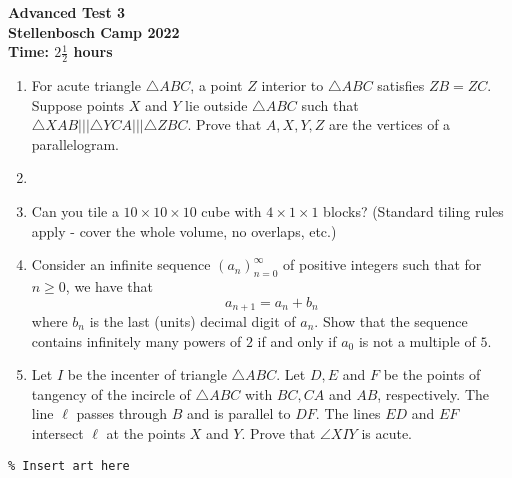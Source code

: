 \documentclass{article}
\begin{document}
\thispagestyle{empty}

\begin{center}
  \textbf{\Large Advanced Test 3}
  \\ \vspace{1em}
  \textbf{\large Stellenbosch Camp 2022}
  \\ \vspace{1em}
  \textbf{\large Time: $2\frac{1}{2}$ hours}
\end{center}

\bigskip

\begin{enumerate}[itemsep=\fill]

\item %
For acute triangle $\triangle ABC$, a point $Z$ interior to $\triangle ABC$ satisfies $ZB=ZC$. Suppose points $X$ and $Y$ lie outside $\triangle ABC$ such that $\triangle XAB |||\triangle YCA |||\triangle ZBC$. Prove that $A,X,Y,Z$ are the vertices of a parallelogram.

\item %


\item %
Can you tile a $10\times 10\times 10$ cube with $4\times 1\times 1$ blocks? (Standard tiling rules apply - cover the whole volume, no overlaps, etc.)


\item %
Consider an infinite sequence $(a_n)_{n=0}^{\infty}$ of positive integers such that for $n \geq 0$, we have that
\[
    a_{n + 1} = a_n + b_n
\]
where $b_n$ is the last (units) decimal digit of $a_n$. Show that the sequence contains infinitely many powers of $2$ if and only if $a_0$ is not a multiple of $5$.


\item %
Let $I$ be the incenter of triangle $\triangle ABC$. Let $D,E$ and $F$ be the points of tangency of the incircle of $\triangle ABC$ with $BC,CA$ and $AB$, respectively. The line $\ell$ passes through $B$ and is parallel to $DF$. The lines $ED$ and $EF$ intersect $\ell$ at the points $X$ and $Y$. Prove that $\angle XIY$ is acute.
\end{enumerate}


\centering
\small
\begin{BVerbatim}
\end{BVerbatim}
\end{document}
